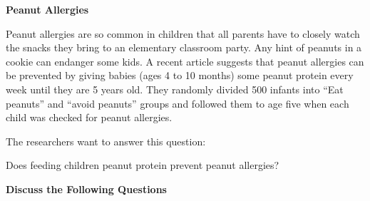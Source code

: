 \def\theTopic{Peanut Allergies}
\def\dayNum{12 }

\begin{center}
{\bf {\large Peanut Allergies}}
\end{center}
\vspace{-.1in}

Peanut allergies are so common in children that all parents have to
closely watch the snacks they bring to an elementary classroom party. 
Any hint of peanuts in a cookie can endanger some kids. A recent
article suggests that peanut allergies can be prevented by giving
babies (ages 4 to 10 months) some peanut protein every week until they
are 5 years old. They randomly divided 500 infants into ``Eat
peanuts'' and ``avoid peanuts'' groups and followed them to age five
when each child was checked for peanut allergies.

The researchers want to answer this question:
\begin{center}
  {\large\sf  Does feeding children peanut protein prevent peanut allergies?} 
\end{center}
{\bf
Discuss the Following Questions	}

